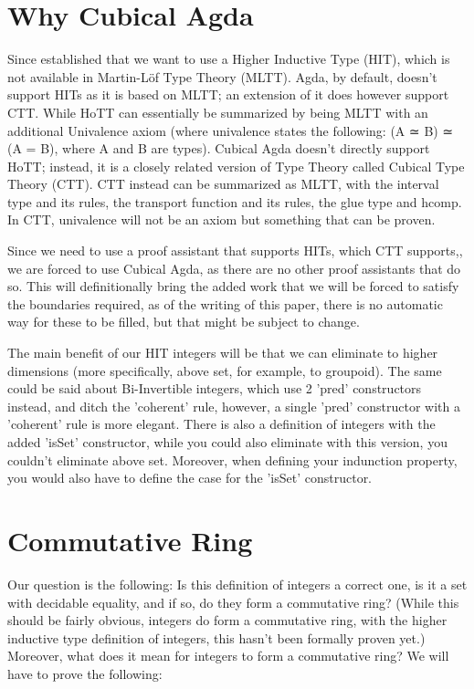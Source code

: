 \section{Why Cubical Agda}

Since established that we want to use a Higher Inductive Type (HIT), which is not available in Martin-Löf Type Theory (MLTT). Agda, by default, doesn't support HITs as it is based on MLTT; an extension of it does however support CTT. While HoTT can essentially be summarized\cite{hottbook} by being MLTT with an additional Univalence axiom (where univalence states the following: (A ≃ B) ≃ (A = B), where A and B are types). Cubical Agda doesn't directly support HoTT; instead, it is a closely related version of Type Theory called Cubical Type Theory (CTT). CTT instead can be summarized as MLTT, with the interval type and its rules, the transport function and its rules, the glue type and hcomp. In CTT, univalence will not be an axiom but something that can be proven\cite{cohen2016cubicaltypetheoryconstructive}.

Since we need to use a proof assistant that supports HITs, which CTT supports,\cite{coquand2018higherinductivetypescubical}, we are forced to use Cubical Agda\cite{10.1145/3341691}, as there are no other proof assistants that do so. This will definitionally bring the added work that we will be forced to satisfy the boundaries required, as of the writing of this paper, there is no automatic way for these to be filled, but that might be subject to change\cite{doré2024automatingboundaryfillingcubical}.

The main benefit of our HIT integers will be that we can eliminate to higher dimensions (more specifically, above set, for example, to groupoid). The same could be said about Bi-Invertible integers, which use 2 'pred' constructors instead, and ditch the 'coherent' rule, however, a single 'pred' constructor with a 'coherent' rule is more elegant. There is also a definition of integers with the added 'isSet' constructor, while you could also eliminate with this version, you couldn't eliminate above set. Moreover, when defining your indunction property, you would also have to define the case for the 'isSet' constructor.

\section{Commutative Ring}
Our question is the following: Is this definition of integers a correct one, is it a set with decidable equality, and if so, do they form a commutative ring? (While this should be fairly obvious, integers do form a commutative ring, with the higher inductive type definition of integers, this hasn't been formally proven yet.) Moreover, what does it mean for integers to form a commutative ring? We will have to prove the following:

